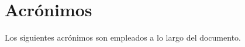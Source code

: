 \chapter*{Acrónimos}
Los siguientes acrónimos son empleados a lo largo del documento.
{
\footnotesize
\setlength{\itemsep}{0.1pt}
\setlength{\parskip}{0pt}
\setlength{\topsep}{0pt}
\setlength{\partopsep}{0pt}
\printacronyms[heading = none]
}